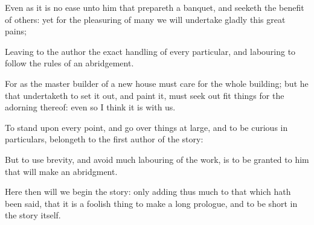 {\par }{\PP {}Even as it is no ease unto him that prepareth a banquet, and seeketh the benefit of others: yet for the pleasuring of many we will undertake gladly this great pains;
\par }{\PP {}Leaving to the author the exact handling of every particular, and labouring to follow the rules of an abridgement.
\par }{\PP {}For as the master builder of a new house must care for the whole building; but he that undertaketh to set it out, and paint it, must seek out fit things for the adorning thereof: even so I think it is with us.
\par }{\PP {}To stand upon every point, and go over things at large, and to be curious in particulars, belongeth to the first author of the story:
\par }{\PP {}But to use brevity, and avoid much labouring of the work, is to be granted to him that will make an abridgment.
\par }{\PP {}Here then will we begin the story: only adding thus much to that which hath been said, that it is a foolish thing to make a long prologue, and to be short in the story itself.

}
